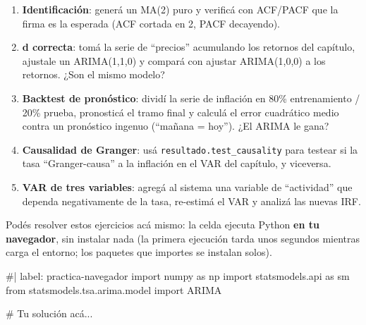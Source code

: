 \documentclass[
  spanish,
  letterpaper,
  DIV=11,
  numbers=noendperiod]{scrreprt}
\newenvironment{Shaded}{\begin{snugshade}}{\end{snugshade}}
\newcommand{\NormalTok}[1]{\textcolor[rgb]{0.00,0.23,0.31}{#1}}
\providecommand{\tightlist}{%
  \setlength{\itemsep}{0pt}\setlength{\parskip}{0pt}}
\begin{document}
\begin{tcolorbox}[enhanced jigsaw, bottomrule=.15mm, colback=white, opacitybacktitle=0.6, arc=.35mm, toprule=.15mm, opacityback=0, breakable, titlerule=0mm, left=2mm, coltitle=black, colbacktitle=quarto-callout-important-color!10!white, colframe=quarto-callout-important-color-frame, leftrule=.75mm, toptitle=1mm, bottomtitle=1mm, title=\textcolor{quarto-callout-important-color}{\faExclamation}\hspace{0.5em}{Ejercicios}, rightrule=.15mm]

\begin{enumerate}
\def\labelenumi{\arabic{enumi}.}
\tightlist
\item
  \textbf{Identificación}: generá un MA(2) puro y verificá con ACF/PACF
  que la firma es la esperada (ACF cortada en 2, PACF decayendo).
\item
  \textbf{d correcta}: tomá la serie de ``precios'' acumulando los
  retornos del capítulo, ajustale un ARIMA(1,1,0) y compará con ajustar
  ARIMA(1,0,0) a los retornos. ¿Son el mismo modelo?
\item
  \textbf{Backtest de pronóstico}: dividí la serie de inflación en 80\%
  entrenamiento / 20\% prueba, pronosticá el tramo final y calculá el
  error cuadrático medio contra un pronóstico ingenuo (``mañana =
  hoy''). ¿El ARIMA le gana?
\item
  \textbf{Causalidad de Granger}: usá \texttt{resultado.test\_causality}
  para testear si la tasa ``Granger-causa'' a la inflación en el VAR del
  capítulo, y viceversa.
\item
  \textbf{VAR de tres variables}: agregá al sistema una variable de
  ``actividad'' que dependa negativamente de la tasa, re-estimá el VAR y
  analizá las nuevas IRF.
\end{enumerate}

\end{tcolorbox}

Podés resolver estos ejercicios acá mismo: la celda ejecuta Python
\textbf{en tu navegador}, sin instalar nada (la primera ejecución tarda
unos segundos mientras carga el entorno; los paquetes que importes se
instalan solos).

\begin{Shaded}
\begin{Highlighting}[]
\NormalTok{\#| label: practica{-}navegador}
\NormalTok{import numpy as np}
\NormalTok{import statsmodels.api as sm}
\NormalTok{from statsmodels.tsa.arima.model import ARIMA}

\NormalTok{\# Tu solución acá...}
\end{Highlighting}
\end{Shaded}
\end{document}
